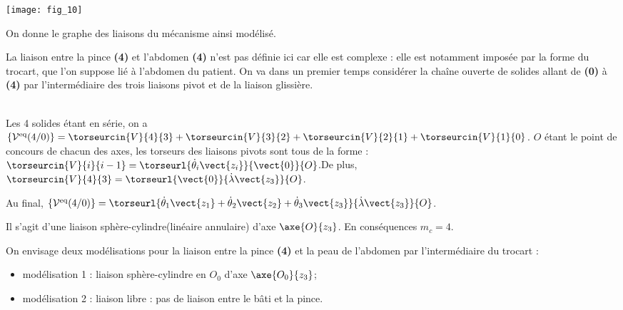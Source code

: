 \begin{marginfigure}
\texttt{[image: fig\_10]}
\end{marginfigure}
On donne le graphe des liaisons du mécanisme ainsi modélisé.


La liaison entre la pince \textbf{(4)} et l’abdomen \textbf{(4)} n’est pas définie ici car elle est complexe : elle est notamment
imposée par la forme du trocart, que l’on suppose lié à l’abdomen du patient.
On va dans un premier temps considérer la chaîne ouverte de solides allant de \textbf{(0)} à \textbf{(4)} par l’intermédiaire des trois liaisons pivot et de la liaison glissière.
\fi

\ifprof
\begin{corrige} ~\\
Les 4 solides étant en série, on a 
$\left\{\mathcal{V}^{\text{eq}}({4}/{0})\right\}=\torseurcin{V}{4}{3}+\torseurcin{V}{3}{2}+\torseurcin{V}{2}{1}+\torseurcin{V}{1}{0}$.
$O$ étant le point de concours de chacun des axes, les torseurs des liaisons pivots sont tous de la forme : 
$\torseurcin{V}{i}{i-1}=\torseurl{\dot{\theta}_i\vect{z_i}}{\vect{0}}{O}$.De plus,  $\torseurcin{V}{4}{3}=\torseurl{\vect{0}}{\dot{\lambda}\vect{z_3}}{O}$. 

Au final, $\left\{\mathcal{V}^{\text{eq}}({4}/{0})\right\}=\torseurl{\dot{\theta}_1\vect{z_1}+\dot{\theta}_2\vect{z_2}+\dot{\theta}_3\vect{z_3}}{\dot{\lambda}\vect{z_3}}{O}$.
 
 Il s'agit d'une liaison sphère-cylindre(linéaire annulaire) d'axe $\axe{O}{z_3}$. En conséquences $m_c=4$.
\end{corrige}
\else
\fi

\ifprof
\else

On envisage deux modélisations pour la liaison entre la pince \textbf{(4)} et la peau de l’abdomen par l’intermédiaire du trocart :
\begin{itemize}
\item modélisation 1 : liaison sphère-cylindre en $O_0$ d’axe $\axe{O_0}{z_3}$;
\item modélisation 2 : liaison libre : pas de liaison entre le bâti et la pince.
\end{itemize}

\fi

